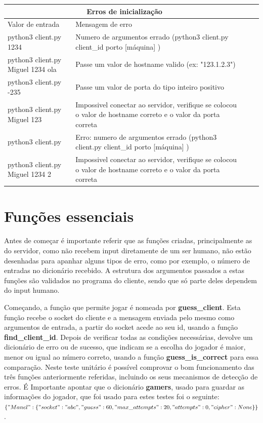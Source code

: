 \documentclass{report}
\theoremstyle{remark}
\begin{document}
\begin{center}
\begin{tabular}{ |p{4cm}||p{7cm}|p{3cm}|p{3cm}|  }
 \hline
 \multicolumn{2}{|c|}{Erros de inicialização} \\
 \hline
 Valor de entrada & Mensagem de erro\\
 \hline
 python3 client.py 1234  &  Numero de argumentos errado (python3 client.py client\_id porto [máquina] )  \\ \hline
 python3 client.py Miguel 1234 ola   &   Passe um valor de hostname valido (ex: "123.1.2.3")  \\ \hline
 python3 client.py -235   &   Passe um valor de porta do tipo inteiro positivo \\ \hline
 python3 client.py Miguel 123   &    Impossivel conectar ao servidor, verifique se colocou o valor de hostname correto e o valor da porta correta \\ \hline
 python3 client.py   &   Erro: numero de argumentos errado (python3 client.py client\_id porto [máquina] ) \\ \hline
 python3 client.py Miguel 1234 2   &    Impossivel conectar ao servidor, verifique se colocou o valor de hostname correto e o valor da porta correta
  \\ \hline
\end{tabular}
\end{center}



\section{Funções essenciais}
\label{sec.funções}
Antes de começar é importante referir que as funções criadas, principalmente as do servidor, como não recebem input diretamente de um ser humano, não estão desenhadas para apanhar alguns tipos de erro, como por exemplo, o número de entradas no dicionário recebido. A estrutura dos argumentos passados a estas funções são validados no programa do cliente, sendo que só parte deles dependem do input humano.

Começando, a função que permite jogar é nomeada por \textbf{guess\_client}. Esta função recebe o socket do cliente e a mensagem enviada pelo mesmo como argumentos de entrada, a partir do socket acede ao seu id, usando a função \textbf{find\_client\_id}. Depois de verificar todas as condições necessárias, devolve um dicionário de erro ou de sucesso, que indicam se a escolha do jogador é maior, menor ou igual ao número correto, usando a função \textbf{guess\_is\_correct} para essa comparação. Neste teste unitário é possível comprovar o bom funcionamento das três funções anteriormente referidas, incluindo os seus mecanismos de detecção de erros. É Importante apontar que o dicionário \textbf{gamers}, usado para guardar as informações do jogador, que foi usado para estes testes foi o seguinte: $ \{"Manel": \{"socket": "abc", "guess": 60, "max\_attempts": 20, "attempts": 0, "cipher": None\}\}$. 
\end{document}
